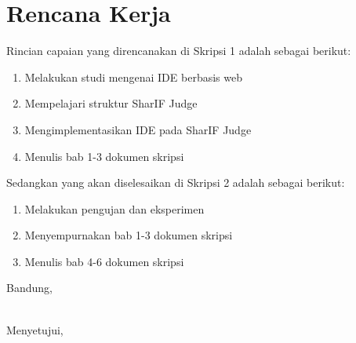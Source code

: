 \documentclass[a4paper,twoside]{article}
\begin{document}
\section{Rencana Kerja}
Rincian capaian yang direncanakan di Skripsi 1 adalah sebagai berikut:
\begin{enumerate}
	\item Melakukan studi mengenai IDE berbasis web
	\item Mempelajari struktur SharIF Judge
	\item Mengimplementasikan IDE pada SharIF Judge
	\item Menulis bab 1-3 dokumen skripsi
\end{enumerate}

Sedangkan yang akan diselesaikan di Skripsi 2 adalah sebagai berikut:
\begin{enumerate}
	\item Melakukan pengujan dan eksperimen
	\item Menyempurnakan bab 1-3 dokumen skripsi
	\item Menulis bab 4-6 dokumen skripsi
\end{enumerate}

\vspace{1cm}
\centering Bandung, \tanggal\\
\vspace{2cm} \nama \\ 
\vspace{1cm}

Menyetujui, \\
\end{document}

